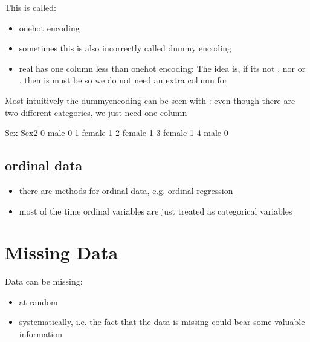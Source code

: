 \documentclass[letterpaper,10pt,english]{jupyterBook}
\begin{document}
\sphinxAtStartPar
This is called:
\begin{itemize}
\item {} 
\sphinxAtStartPar
one\sphinxhyphen{}hot encoding

\item {} 
\sphinxAtStartPar
sometimes this is also incorrectly called dummy encoding

\item {} 
\sphinxAtStartPar
real  has one column less than one\sphinxhyphen{}hot encoding: The idea is, if its not , nor  or , then is must be  \sphinxhyphen{} so we do not need an extra column for 

\end{itemize}

\sphinxAtStartPar
Most intuitively the  dummy\sphinxhyphen{}encoding can be seen with : even though there are two different categories, we just need one column

\begin{sphinxVerbatim}[commandchars=\\\{\}]
      Sex  Sex2
0    male     0
1  female     1
2  female     1
3  female     1
4    male     0
\end{sphinxVerbatim}


\section{ordinal data}
\label{\detokenize{Data_Basics:ordinal-data}}\begin{itemize}
\item {} 
\sphinxAtStartPar
there are methods for ordinal data, e.g. ordinal regression

\item {} 
\sphinxAtStartPar
most of the time ordinal variables are just treated as categorical variables

\end{itemize}


\chapter{Missing Data}
\label{\detokenize{Data_Basics:missing-data}}
\sphinxAtStartPar
Data can be missing:
\begin{itemize}
\item {} 
\sphinxAtStartPar
at random

\item {} 
\sphinxAtStartPar
systematically, i.e. the fact that the data is missing could bear some valuable information

\end{itemize}
\end{document}
